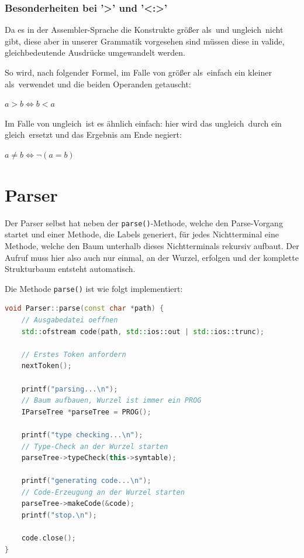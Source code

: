 \documentclass[listof=totoc,DIV11,a4paper]{scrreprt}
\begin{document}
\subsubsection{Besonderheiten bei '>' und '<:>'}
Da es in der Assembler-Sprache die Konstrukte \glqq größer als\grqq\ und \glqq ungleich\grqq\ nicht gibt, diese aber in unserer Grammatik vorgesehen sind müssen diese in valide, gleichbedeutende Ausdrücke umgewandelt werden.

So wird, nach folgender Formel, im Falle von \glqq größer als\grqq\ einfach ein \glqq kleiner als\grqq\ verwendet und die beiden Operanden getauscht:

$a > b \iff b < a$

Im Falle von \glqq ungleich\grqq\ ist es ähnlich einfach: hier wird das \glqq ungleich\grqq\ durch ein \glqq gleich\grqq\ ersetzt und das Ergebnis am Ende negiert:

$a \neq b \iff \neg(a = b)$

\section{Parser}\label{sec:parser_bin}
Der Parser selbst hat neben der \verb+parse()+-Methode, welche den Parse-Vorgang startet und einer Methode, die Labels generiert, für jedes Nichtterminal eine Methode, welche den Baum unterhalb dieses Nichtterminals rekursiv aufbaut. Der Aufruf muss hier also auch nur einmal, an der Wurzel, erfolgen und der komplette Strukturbaum entsteht automatisch.

Die Methode \verb+parse()+ ist wie folgt implementiert:

\begin{lstlisting}[language=C++,label=lst:parser_parse,caption=Parser: Methode parse()]
void Parser::parse(const char *path) {
	// Ausgabedatei oeffnen
    std::ofstream code(path, std::ios::out | std::ios::trunc);

    // Erstes Token anfordern
    nextToken();

    printf("parsing...\n");
    // Baum aufbauen, Wurzel ist immer ein PROG
    IParseTree *parseTree = PROG();
    
    printf("type checking...\n");
    // Type-Check an der Wurzel starten
    parseTree->typeCheck(this->symtable);
    
    printf("generating code...\n");
    // Code-Erzeugung an der Wurzel starten
    parseTree->makeCode(&code);
    printf("stop.\n");

    code.close();
}
\end{lstlisting}
\end{document}
